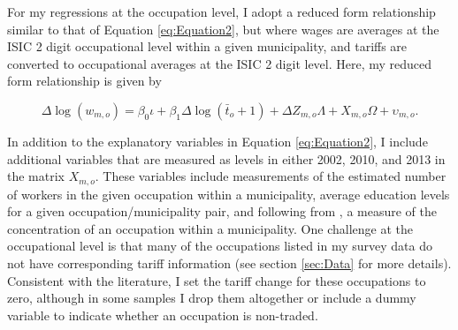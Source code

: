 For my regressions at the occupation level, I adopt a reduced form relationship similar to that
of Equation \ref{eq:Equation2}, but where wages are averages at the ISIC 2 digit occupational level
within a given municipality, and tariffs are converted to occupational averages at the ISIC 2 digit level. 
Here, my reduced form relationship is given by

\begin{equation}
\label{eq:Equation4}
\Delta\log(w_{m,o}) = \beta_0 \iota + \beta_1 \Delta\log(\bar{t}_{o}+1)+ \Delta Z_{m,o} \Lambda
+X_{m,o} \Omega+\upsilon_{m,o}.
\end{equation}

In addition to the explanatory variables in Equation \ref{eq:Equation2}, I include additional variables 
that are measured as levels in either 2002, 2010, and 2013 in the matrix $X_{m,o}$. 
These variables include measurements of the estimated number of workers in the given occupation
within a municipality, average education levels for a given occupation/municipality pair, and 
following from \citet{holmes1}, a measure of the concentration of an occupation within a municipality.
One challenge at the occupational level is that many of the occupations listed in my survey data do
not have corresponding tariff information (see section \ref{sec:Data} for more details). Consistent 
with the literature, I set the tariff change for these occupations to zero, although in some samples I 
drop them altogether or include a dummy variable to indicate whether an occupation is non-traded.


